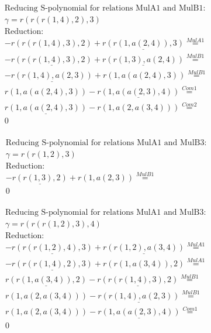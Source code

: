 \documentclass[11pt]{amsart}
\begin{document}
\begin{align*} 
& \text{Reducing S-polynomial for relations MulA1 and MulB1:} \\ 
& \gamma = r(r(r(1,4),2),3) \\ 
& \text{Reduction}: \\& - r(r(r(1,4),3),2) + \underline{r(r(1,a(2,4)),3)} \stackrel{ MulA1 }{=}  \\ 
& - \underline{r(r(r(1,4),3),2)} + \underline{r(r(1,3),a(2,4))} \stackrel{ MulB1 }{=}  \\ 
& - \underline{r(r(1,4),a(2,3))} + r(1,a(a(2,4),3)) \stackrel{ MulB1 }{=}  \\ 
&r(1,a(a(2,4),3)) - \underline{r(1,a(a(2,3),4))} \stackrel{ Com1 }{=}  \\ 
&\underline{r(1,a(a(2,4),3))} - r(1,a(2,a(3,4))) \stackrel{ Com2 }{=}  \\ 
&0\\ 
\end{align*} 
 
\begin{align*} 
& \text{Reducing S-polynomial for relations MulA1 and MulB3:} \\ 
& \gamma = r(r(1,2),3) \\ 
& \text{Reduction}: \\& - \underline{r(r(1,3),2)} + r(1,a(2,3)) \stackrel{ MulB1 }{=}  \\ 
&0\\ 
\end{align*} 
 
\begin{align*} 
& \text{Reducing S-polynomial for relations MulA1 and MulB3:} \\ 
& \gamma = r(r(r(1,2),3),4) \\ 
& \text{Reduction}: \\& - \underline{r(r(r(1,2),4),3)} + \underline{r(r(1,2),a(3,4))} \stackrel{ MulA1 }{=}  \\ 
& - \underline{r(r(r(1,4),2),3)} + r(r(1,a(3,4)),2) \stackrel{ MulA1 }{=}  \\ 
&\underline{r(r(1,a(3,4)),2)} - \underline{r(r(r(1,4),3),2)} \stackrel{ MulB1 }{=}  \\ 
&r(1,a(2,a(3,4))) - \underline{r(r(1,4),a(2,3))} \stackrel{ MulB1 }{=}  \\ 
&r(1,a(2,a(3,4))) - \underline{r(1,a(a(2,3),4))} \stackrel{ Com1 }{=}  \\ 
&0\\ 
\end{align*} 
 
\end{document}

